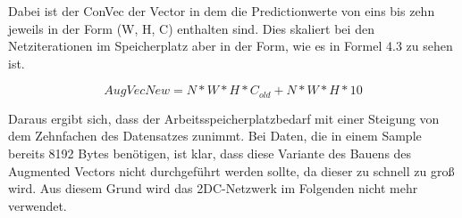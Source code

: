 Dabei ist der ConVec der Vector in dem die Predictionwerte von eins bis zehn jeweils in der Form (W, H, C) enthalten sind. Dies skaliert bei 
den Netziterationen im Speicherplatz aber in der Form, wie es in Formel 4.3 zu sehen ist.  

\begin{equation}
    AugVecNew = N*W*H*C_{old} + N*W*H*10
\end{equation}

Daraus ergibt sich, dass der Arbeitsspeicherplatzbedarf mit einer Steigung von dem Zehnfachen des Datensatzes zunimmt. Bei Daten, die in einem Sample 
bereits 8192 Bytes benötigen, ist klar, dass diese Variante des Bauens des Augmented Vectors nicht durchgeführt werden sollte, da dieser zu 
schnell zu groß wird. Aus diesem Grund wird das 2DC-Netzwerk im Folgenden nicht mehr verwendet. 
